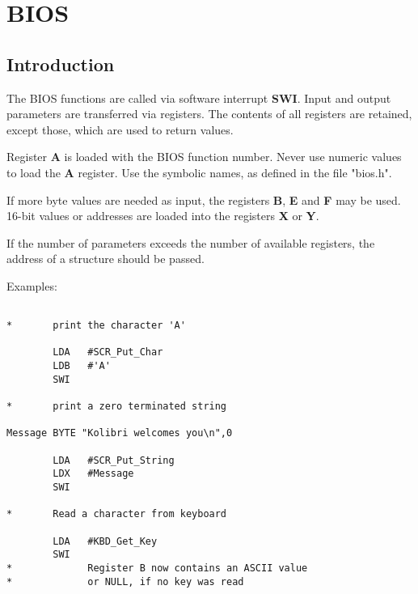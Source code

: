 \chapter{BIOS}

\section{Introduction}

The BIOS functions are called via software interrupt {\bf SWI}.
Input and output parameters are transferred via registers.
The contents of all registers are retained, except those,
which are used to return values.

Register {\bf A} is loaded with the BIOS function number.
Never use numeric values to load the {\bf A} register.
Use the symbolic names, as defined in the file "bios.h".

If more byte values are needed as input, the registers
{\bf B}, {\bf E} and {\bf F} may be used.
16-bit values or addresses are loaded into the registers
{\bf X} or {\bf Y}.

If the number of parameters exceeds the number of available
registers, the address of a structure should be passed.

Examples:
\begin{verbatim}

*       print the character 'A'

        LDA   #SCR_Put_Char
        LDB   #'A'
        SWI

*       print a zero terminated string

Message BYTE "Kolibri welcomes you\n",0

        LDA   #SCR_Put_String
        LDX   #Message
        SWI

*       Read a character from keyboard

        LDA   #KBD_Get_Key
        SWI
*             Register B now contains an ASCII value
*             or NULL, if no key was read

\end{verbatim}

